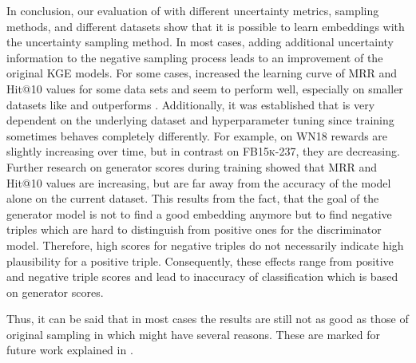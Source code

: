 In conclusion, our evaluation of \usgan with different uncertainty metrics, sampling methods, and different datasets show that it is possible to learn embeddings with the uncertainty sampling method.
In most cases, adding additional uncertainty information to the negative sampling process leads to an improvement of the original \ac{KGE} models.
For some cases, \usgan increased the learning curve of MRR and Hit@10 values for some data sets and seem to perform well, especially on smaller datasets like \umls and outperforms \kbgan.
Additionally, it was established that \usgan is very dependent on the underlying dataset and hyperparameter tuning since training sometimes behaves completely differently.
For example, on \textsc{WN18} rewards are slightly increasing over time, but in contrast on \textsc{FB15k-237}, they are decreasing.
Further research on generator scores during training showed that MRR and Hit@10 values are increasing, but are far away from the accuracy of the model alone on the current dataset.
This results from the fact, that the goal of the generator model is not to find a good embedding anymore but to find negative triples which are hard to distinguish from positive ones for the discriminator model.
Therefore, high scores for negative triples do not necessarily indicate high plausibility for a positive triple.
Consequently, these effects range from positive and negative triple scores and lead to inaccuracy of classification which is based on generator scores.

Thus, it can be said that in most cases the results are still not as good as those of original sampling in \kbgan which might have several reasons.
These are marked for future work explained in .